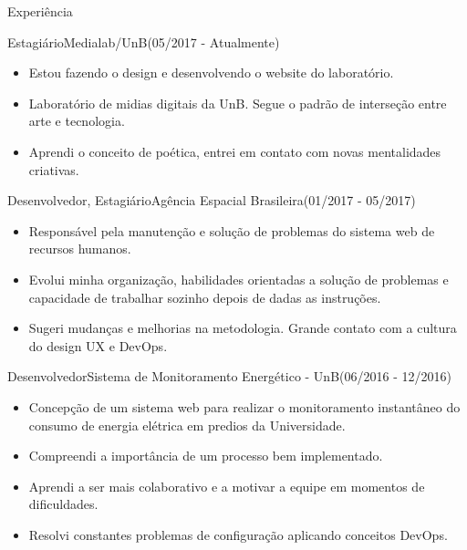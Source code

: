 \documentclass[]{fraguilarcv}
\begin{document}
	\makeheader

	\begin{cvsection}{Experiência}
    \begin{cvsubsection}{Estagiário}{Medialab/UnB}{(05/2017 - Atualmente)}
			\begin{itemize}
              \item Estou fazendo o design e desenvolvendo o website do laboratório.
              \item Laboratório de midias digitais da UnB. Segue o padrão de interseção entre arte e tecnologia.
              \item Aprendi o conceito de poética, entrei em contato com novas mentalidades criativas.
			\end{itemize}
		\end{cvsubsection}
		\begin{cvsubsection}{Desenvolvedor, Estagiário}{Agência Espacial Brasileira}{(01/2017 - 05/2017)}
			\begin{itemize}
              \item Responsável pela manutenção e solução de problemas do sistema web de recursos humanos.
              \item Evolui minha organização, habilidades orientadas a solução de problemas e capacidade de trabalhar sozinho depois de dadas as instruções.
              \item Sugeri mudanças e melhorias na metodologia. Grande contato com a cultura do design UX e DevOps.
			\end{itemize}
		\end{cvsubsection}

		\begin{cvsubsection}{Desenvolvedor}{Sistema de Monitoramento Energético - UnB}{(06/2016 - 12/2016)}
			\begin{itemize}
              \item Concepção de um sistema web para realizar o monitoramento instantâneo do consumo de energia elétrica em predios da Universidade.
              \item Compreendi a importância de um processo bem implementado.
              \item Aprendi a ser mais colaborativo e a motivar a equipe em momentos de dificuldades.
              \item Resolvi constantes problemas de configuração aplicando conceitos DevOps.
			\end{itemize}
		\end{cvsubsection}


\end{cvsection}
\end{document}
